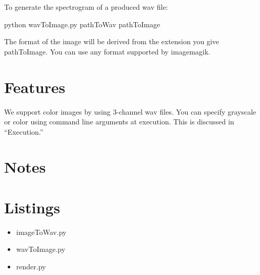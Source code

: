 \documentclass[12pt]{article}
\begin{document}
To generate the spectrogram of a produced wav file:

python wavToImage.py pathToWav pathToImage

The format of the image will be derived from the extension you give pathToImage. You can use any format supported by imagemagik.



\section{Features}

We support color images by using 3-channel wav files. You can specify grayscale or color using command line arguments at execution. This is discussed in ``Execution.''


\section{Notes}


\section{Listings}

\begin{itemize}
\item imageToWav.py
\item wavToImage.py
\item render.py
\end{itemize}
\end{document}
